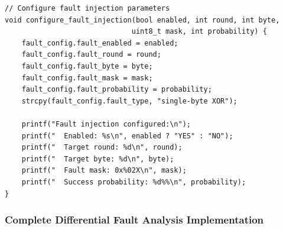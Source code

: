 \documentclass[12pt,a4paper]{article}
\begin{document}
\begin{lstlisting}[caption={AES Implementation with Controlled Fault Injection}]
// Configure fault injection parameters
void configure_fault_injection(bool enabled, int round, int byte, 
                              uint8_t mask, int probability) {
    fault_config.fault_enabled = enabled;
    fault_config.fault_round = round;
    fault_config.fault_byte = byte;
    fault_config.fault_mask = mask;
    fault_config.fault_probability = probability;
    strcpy(fault_config.fault_type, "single-byte XOR");
    
    printf("Fault injection configured:\n");
    printf("  Enabled: %s\n", enabled ? "YES" : "NO");
    printf("  Target round: %d\n", round);
    printf("  Target byte: %d\n", byte);
    printf("  Fault mask: 0x%02X\n", mask);
    printf("  Success probability: %d%%\n", probability);
}
\end{lstlisting}

\subsubsection{Complete Differential Fault Analysis Implementation}
\end{document}
